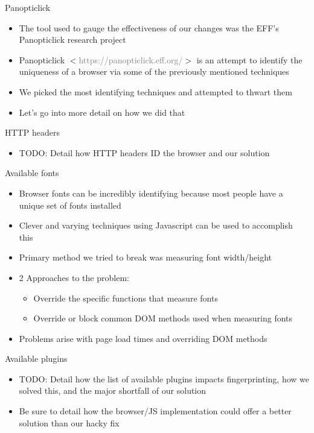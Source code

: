 \begin{frame}[fragile,t]{Panopticlick}
	\begin{itemize}
		\item The tool used to gauge the effectiveness of our changes was the EFF's Panopticlick research project
		\item Panopticlick $<$\textcolor{gray}{https://panopticlick.eff.org/}$>$ is an attempt to identify the uniqueness of a browser via some of the previously mentioned techniques
		\item We picked the most identifying techniques and attempted to thwart them
		\item Let's go into more detail on how we did that
	\end{itemize}
\end{frame}

\begin{frame}[fragile,t]{HTTP headers}
	\begin{itemize}
		\item TODO: Detail how HTTP headers ID the browser and our solution
	\end{itemize}
\end{frame}

\begin{frame}[fragile,t]{Available fonts}
	\begin{itemize}
		\item Browser fonts can be incredibly identifying because most people have a unique set of fonts installed
		\item Clever and varying techniques using Javascript can be used to accomplish this
		\item Primary method we tried to break was measuring font width/height
		\item 2 Approaches to the problem:
			\begin{itemize}
				\item Override the specific functions that measure fonts
				\item Override or block common DOM methods used when measuring fonts
			\end{itemize}
		\item Problems arise with page load times and overriding DOM methods	
	\end{itemize}
\end{frame}

\begin{frame}[fragile,t]{Available plugins}
	\begin{itemize}
		\item TODO: Detail how the list of available plugins impacts fingerprinting, how we solved this, and the major shortfall of our solution
		\item Be sure to detail how the browser/JS implementation could offer a better solution than our hacky fix
	\end{itemize}
\end{frame}

